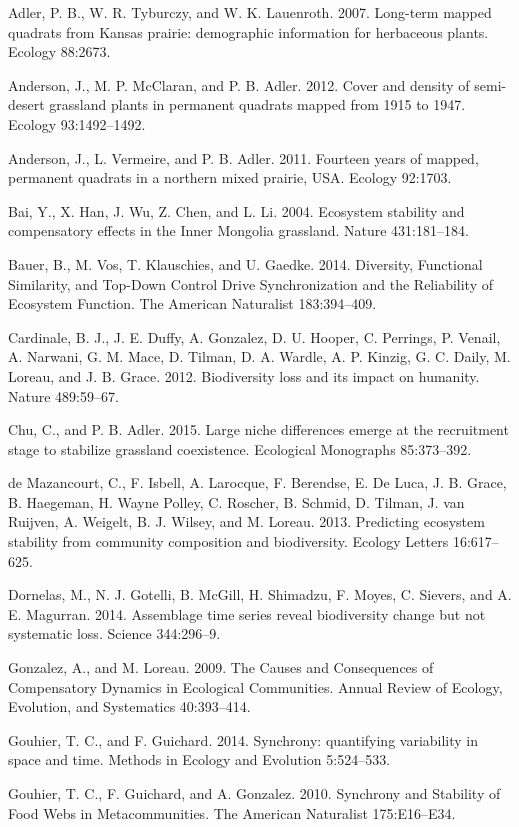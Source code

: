 \documentclass[12pt,]{article}
\begin{document}
Adler, P. B., W. R. Tyburczy, and W. K. Lauenroth. 2007. Long-term
mapped quadrats from Kansas prairie: demographic information for
herbaceous plants. Ecology 88:2673.

Anderson, J., M. P. McClaran, and P. B. Adler. 2012. Cover and density
of semi-desert grassland plants in permanent quadrats mapped from 1915
to 1947. Ecology 93:1492--1492.

Anderson, J., L. Vermeire, and P. B. Adler. 2011. Fourteen years of
mapped, permanent quadrats in a northern mixed prairie, USA. Ecology
92:1703.

Bai, Y., X. Han, J. Wu, Z. Chen, and L. Li. 2004. Ecosystem stability
and compensatory effects in the Inner Mongolia grassland. Nature
431:181--184.

Bauer, B., M. Vos, T. Klauschies, and U. Gaedke. 2014. Diversity,
Functional Similarity, and Top-Down Control Drive Synchronization and
the Reliability of Ecosystem Function. The American Naturalist
183:394--409.

Cardinale, B. J., J. E. Duffy, A. Gonzalez, D. U. Hooper, C. Perrings,
P. Venail, A. Narwani, G. M. Mace, D. Tilman, D. A. Wardle, A. P.
Kinzig, G. C. Daily, M. Loreau, and J. B. Grace. 2012. Biodiversity loss
and its impact on humanity. Nature 489:59--67.

Chu, C., and P. B. Adler. 2015. Large niche differences emerge at the
recruitment stage to stabilize grassland coexistence. Ecological
Monographs 85:373--392.

{{de Mazancourt}}, C., F. Isbell, A. Larocque, F. Berendse, E. {De
Luca}, J. B. Grace, B. Haegeman, H. {Wayne Polley}, C. Roscher, B.
Schmid, D. Tilman, J. van Ruijven, A. Weigelt, B. J. Wilsey, and M.
Loreau. 2013. Predicting ecosystem stability from community composition
and biodiversity. Ecology Letters 16:617--625.

Dornelas, M., N. J. Gotelli, B. McGill, H. Shimadzu, F. Moyes, C.
Sievers, and A. E. Magurran. 2014. Assemblage time series reveal
biodiversity change but not systematic loss. Science 344:296--9.

Gonzalez, A., and M. Loreau. 2009. The Causes and Consequences of
Compensatory Dynamics in Ecological Communities. Annual Review of
Ecology, Evolution, and Systematics 40:393--414.

Gouhier, T. C., and F. Guichard. 2014. Synchrony: quantifying
variability in space and time. Methods in Ecology and Evolution
5:524--533.

Gouhier, T. C., F. Guichard, and A. Gonzalez. 2010. Synchrony and
Stability of Food Webs in Metacommunities. The American Naturalist
175:E16--E34.
\end{document}
